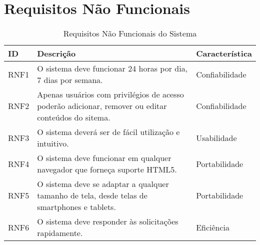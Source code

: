 \section{Requisitos Não Funcionais}

\begin{table}[H]
\begin{tabular}{|l| p{11cm} ||l|}
	\hline
	\textbf{ID} & \textbf{Descrição} & \textbf{Característica}\tabularnewline
	\hline
	\hline
	RNF1 & O sistema deve funcionar 24 horas por dia, 7 dias por semana. & Confiabilidade\tabularnewline
	\hline
	RNF2 & Apenas usuários com privilégios de acesso poderão adicionar, remover ou editar conteúdos do sitema. & Confiabilidade\tabularnewline
	\hline
	RNF3 & O sistema deverá ser de fácil utilização e intuitivo. & Usabilidade\tabularnewline
	\hline
	RNF4 & O sistema deve funcionar em qualquer navegador que forneça suporte HTML5. & Portabilidade\tabularnewline
	\hline
	RNF5 & O sistema deve se adaptar a qualquer tamanho de tela, desde telas de smartphones e tablets. & Portabilidade\tabularnewline
	\hline
	RNF6 & O sistema deve responder às solicitações rapidamente. & Eficiência\tabularnewline
	\hline
\end{tabular}
\caption{Requisitos Não Funcionais do Sistema}
\label{Requisitos_nao_Funcionais_do_Sistema}
\end{table}